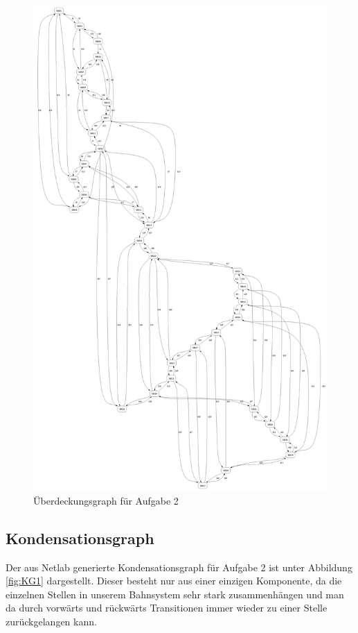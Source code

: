 \documentclass[10pt]{scrartcl}
\begin{document}
\begin{figure}[htbp]
	\centering	\includegraphics[height=1.0\textheight]{Bilder/Aufgabe2_UG.png}
	\caption{Überdeckungsgraph für Aufgabe 2}
	\label{fig:UG2}
\end{figure}

\subsection{Kondensationsgraph}
Der aus Netlab generierte Kondensationsgraph für Aufgabe 2 ist unter Abbildung \ref{fig:KG1} dargestellt. Dieser besteht nur aus einer einzigen Komponente, da die einzelnen Stellen in unserem Bahnsystem sehr stark zusammenhängen und man da durch vorwärts und rückwärts Transitionen immer wieder zu einer Stelle zurückgelangen kann.
\end{document}
